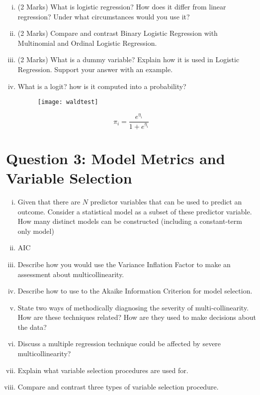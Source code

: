\documentclass{article}
\begin{document}
\begin{enumerate}[(i)]

\item (2 Marks) What is logistic regression? How does it differ from linear regression? Under what circumstances would you use it?

\item (2 Marks) Compare and contrast Binary Logistic Regression with Multinomial and Ordinal Logistic Regression.
	
\item (2 Marks) What is a dummy variable? Explain how it is used in Logistic Regression. Support your answer with an example.

\item What is a logit? how is it computed into a probability?

\begin{figure}[h!]
\centering
\texttt{[image: waldtest]}
\caption{}
\label{fig:waldtest}
\end{figure}



\end{enumerate}



	\[ \pi_i  =  \frac{e^{\eta_i}}{1 + e^{\eta_i}} \]
\newpage
\section*{Question 3: Model Metrics and Variable Selection}

\begin{enumerate}[(i)]
	\item Given that there are $N$ predictor variables that can be used to predict an outcome. Consider a statistical model as a subset of these predictor variable. How many distinct models can be constructed (including a constant-term only model)
	\item AIC

\item Describe how you would use the Variance Inflation Factor to make an assessment about multicollinearity.
\item Describe how to use to the Akaike Information Criterion for model selection.

\item State two ways of methodically diagnosing the severity of multi-collinearity. How are these techniques related? How are they used to make decisions about the data?
\item Discuss a multiple regression technique could be affected by severe multicollinearity?

\item Explain what variable selection procedures are used for.
\item Compare and contrast three types of variable selection procedure.



\end{enumerate}
\end{document}
